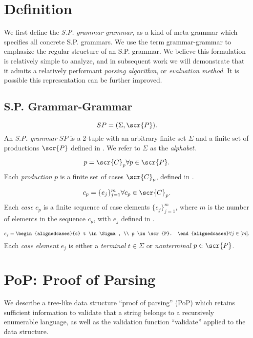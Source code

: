\documentclass[10pt]{article}
\begin{document}
\section{Definition}
\label{sec:definition}
We first define the \textit{S.P. grammar-grammar}, as a kind of meta-grammar which specifies all concrete S.P. grammars. We use the term grammar-grammar to emphasize the regular structure of an S.P. grammar. We believe this formulation is relatively simple to analyze, and in subsequent work we will demonstrate that it admits a relatively performant \textit{parsing algorithm}, or \textit{evaluation method}. It is possible this representation can be further improved.

\subsection{S.P. Grammar-Grammar}
\label{sec:grammar-grammar}
\begin{equation}
  \label{eq:sp}
  SP = (\Sigma, \scr{P}).
\end{equation}
An \textit{S.P. grammar} $SP$ is a 2-tuple with an arbitrary finite set $\Sigma$ and a finite set of productions $\scr{P}$ defined in . We refer to $\Sigma$ as the \textit{alphabet}.

\begin{equation}
  \label{eq:p}
  p = \scr{C}_p \forall p \in \scr{P}.
\end{equation}
Each \textit{production} $p$ is a finite set of cases $\scr{C}_p$, defined in .

\begin{equation}
  \label{eq:cp}
  c_p = \{e_j\}_{j=1}^m \forall c_p \in \scr{C}_p.
\end{equation}
Each \textit{case} $c_p$ is a finite sequence of case elements $\{e_j\}_{j=1}^m$, where $m$ is the number of elements in the sequence $c_p$, with $e_j$ defined in .

\begin{equation}
  \label{eq:ej}
  e_j = \begin{alignedcases}{c}
    t \in \Sigma, \\
    p \in \scr{P}.
  \end{alignedcases} \forall j \in [m].
\end{equation}
Each \textit{case element} $e_j$ is either a \textit{terminal} $t \in \Sigma$ or \textit{nonterminal} $p \in \scr{P}$.

\section{PoP: Proof of Parsing}
\label{sec:proof-of-parsing}
We describe a tree-like data structure ``proof of parsing'' (PoP) which retains sufficient information to validate that a string belongs to a recursively enumerable language, as well as the validation function ``validate'' applied to the data structure.
\end{document}
